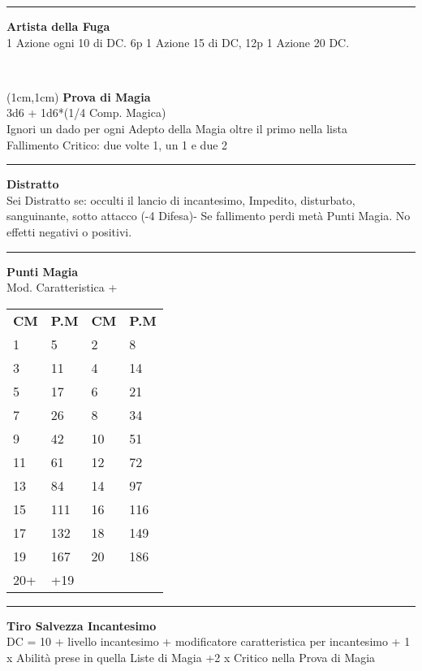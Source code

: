 \documentclass[a4paper,12 pt,openany]{book}
\newcommand{\riga}{\rule{\textwidth}{0.4pt}}
\begin{document}
\begin{textblock*}{7cm}
\riga

\textbf{Artista della Fuga}\\
1 Azione ogni 10 di DC. 6p 1 Azione 15 di DC, 12p 1 Azione 20 DC.

\end{textblock*}

~\newpage

\begin{textblock*}{5cm}(1cm,1cm) %
\textbf{Prova di Magia}\\
3d6 + 1d6*(1/4 Comp. Magica)\\
Ignori un dado per ogni Adepto della Magia oltre il primo nella lista\\
Fallimento Critico: due volte 1, un 1 e due 2\\


\riga

\textbf{Distratto}\\
Sei Distratto se: occulti il lancio di incantesimo, Impedito, disturbato, sanguinante, sotto attacco (-4 Difesa)-
Se fallimento perdi metà Punti Magia. No effetti negativi o positivi.\\

\riga

\textbf{Punti Magia}\\
Mod. Caratteristica + \\

\begin{tabular}{ll|ll}
\textbf{CM} & \textbf{P.M}&	\textbf{CM} & \textbf{P.M}\\
	1 &5 &2&8 \\
	3&11&4&14\\
	5&17&6&21\\
	7&26&8&34\\
	9&42&10&51\\
	11&61&12&72\\
	13&84&14&97\\
	15&111&16&116\\
	17&132&18&149\\
	19&167&20&186\\
	20+&+19&&\\
\end{tabular}

\riga

\textbf{Tiro Salvezza Incantesimo}\\
DC = 10 + livello incantesimo + modificatore caratteristica per incantesimo + 1 x Abilità prese in quella Liste di Magia +2 x Critico nella Prova di Magia


\end{textblock*}
\end{document}
